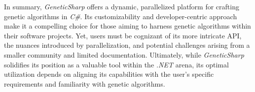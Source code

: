   In summary, \textit{GeneticSharp} offers a dynamic, parallelized platform for 
  crafting genetic algorithms in \textit{C\#}. 
  Its customizability and developer-centric approach make it a compelling choice 
  for those aiming to harness genetic algorithms within their software projects. 
  Yet, users must be cognizant of its more intricate API, the nuances introduced 
  by parallelization, and potential challenges arising from a smaller community 
  and limited documentation.
  Ultimately, while \textit{GeneticSharp} solidifies its position as a valuable 
  tool within the \textit{.NET} arena, its optimal utilization depends on aligning 
  its capabilities with the user's specific requirements and familiarity with 
  genetic algorithms.
